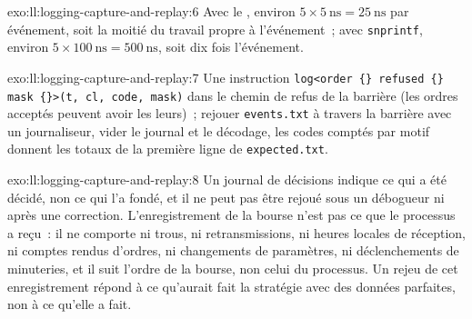 \begin{solution}{exo:ll:logging-capture-and-replay:6}
Avec le , environ $5 \times \qty{5}{\nano\second} = \qty{25}{\nano\second}$ par événement, soit la moitié du travail propre à
l'événement~; avec \texttt{snprintf}, environ $5 \times \qty{100}{\nano\second} = \qty{500}{\nano\second}$, soit dix fois l'événement.
\end{solution}

\begin{solution}{exo:ll:logging-capture-and-replay:7}
Une instruction \texttt{log<\textquotedbl{}order \{\} refused \{\} mask \{\}\textquotedbl{}>(t, cl, code, mask)} dans le chemin de refus de la
barrière (les ordres acceptés peuvent avoir les leurs)~; rejouer \texttt{events.txt} à travers la barrière avec un journaliseur, vider le journal et
le décodage, les codes comptés par motif donnent les totaux de la première ligne de \texttt{expected.txt}.
\end{solution}

\begin{solution}{exo:ll:logging-capture-and-replay:8}
Un journal de décisions indique ce qui a été décidé, non ce qui l'a fondé, et il ne peut pas être rejoué sous un débogueur ni après une correction. L'enregistrement de la bourse
n'est pas ce que le processus a reçu~: il ne comporte ni trous, ni retransmissions, ni heures locales de réception, ni
comptes rendus d'ordres, ni changements de paramètres, ni déclenchements de minuteries, et il suit l'ordre de la bourse, non celui du processus. Un rejeu de cet
enregistrement répond à ce qu'aurait fait la stratégie avec des données parfaites, non à ce qu'elle a fait.
\end{solution}

